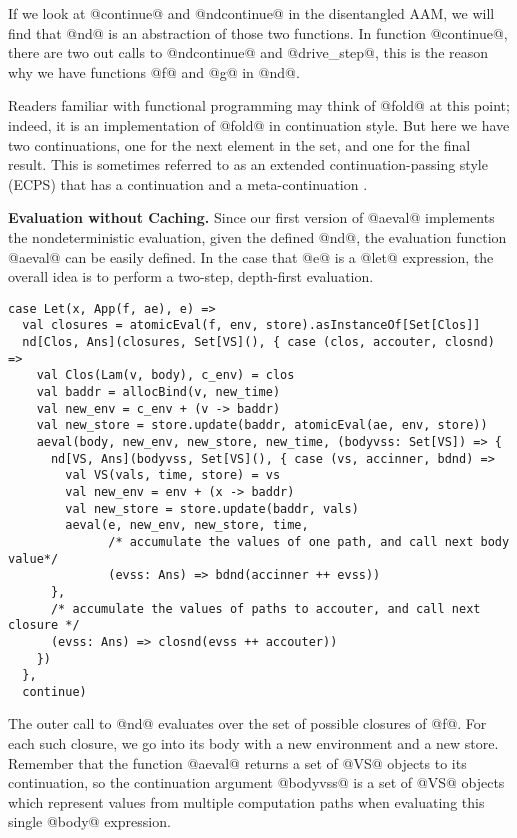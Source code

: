 \documentclass[acmsmall,review,anonymous]{acmart}\settopmatter{printfolios=true,printccs=false,printacmref=false}
\begin{document}
If we look at @continue@ and @ndcontinue@ in the disentangled AAM, we will find
that @nd@ is an abstraction of those two functions. In function @continue@,
there are two out calls to @ndcontinue@ and @drive_step@, this is the reason why 
we have functions @f@ and @g@ in @nd@.

Readers familiar with functional programming may think of @fold@ at this point; indeed, 
it is an implementation of @fold@ in continuation style. But here we have two 
continuations, one for the next element in the set, and one for the final result.
This is sometimes referred to as an extended continuation-passing style (ECPS) 
that has a continuation and a meta-continuation \cite{Danvy:1990:AC:91556.91622}.

\textbf{Evaluation without Caching.}
Since our first version of @aeval@ implements the nondeterministic
evaluation, given the defined @nd@, the evaluation function @aeval@ can be easily
defined. In the case that @e@ is a @let@ expression,
the overall idea is to perform a two-step, depth-first evaluation. 

\begin{lstlisting}
case Let(x, App(f, ae), e) =>
  val closures = atomicEval(f, env, store).asInstanceOf[Set[Clos]]
  nd[Clos, Ans](closures, Set[VS](), { case (clos, accouter, closnd) =>
    val Clos(Lam(v, body), c_env) = clos
    val baddr = allocBind(v, new_time)
    val new_env = c_env + (v -> baddr)
    val new_store = store.update(baddr, atomicEval(ae, env, store))
    aeval(body, new_env, new_store, new_time, (bodyvss: Set[VS]) => {
      nd[VS, Ans](bodyvss, Set[VS](), { case (vs, accinner, bdnd) =>
        val VS(vals, time, store) = vs
        val new_env = env + (x -> baddr)
        val new_store = store.update(baddr, vals)
        aeval(e, new_env, new_store, time,
              /* accumulate the values of one path, and call next body value*/
              (evss: Ans) => bdnd(accinner ++ evss))
      },
      /* accumulate the values of paths to accouter, and call next closure */
      (evss: Ans) => closnd(evss ++ accouter))
    })
  },
  continue)
\end{lstlisting}

The outer call to @nd@ evaluates over the set of possible closures of
@f@. For each such closure, we go into its body with a new environment and a new store.
Remember that the function @aeval@ returns a set of @VS@ objects to its continuation,
so the continuation argument @bodyvss@ is a set of @VS@ objects which represent values
from multiple computation paths when evaluating this single @body@ expression.
\end{document}
